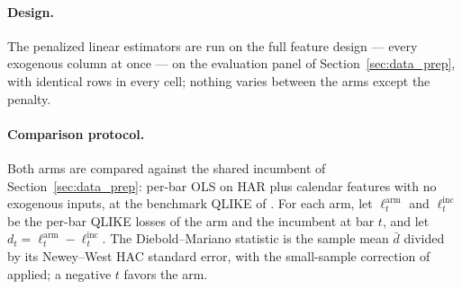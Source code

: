 \paragraph{Design.}
The penalized linear estimators are run on the full feature design ---
every exogenous column at once --- on the evaluation panel of
Section~\ref{sec:data_prep}, with identical rows in every cell;
nothing varies between the arms except the penalty.

\paragraph{Comparison protocol.}
Both arms are compared against the shared incumbent of
Section~\ref{sec:data_prep}: per-bar OLS on HAR plus calendar features with
no exogenous inputs, at the benchmark QLIKE of \unifAzeroQLIKE{}. For each
arm, let $\ell^{\mathrm{arm}}_t$ and
$\ell^{\mathrm{inc}}_t$ be the per-bar QLIKE losses \citep{Patton2011} of
the arm and the incumbent at bar $t$, and let
$d_t = \ell^{\mathrm{arm}}_t - \ell^{\mathrm{inc}}_t$. The Diebold--Mariano
statistic \citep{DieboldMariano1995} is the sample mean $\bar d$ divided by
its Newey--West HAC standard error, with the small-sample correction of
\citet{HarveyLeybourneNewbold1997} applied; a negative $t$ favors the arm.

